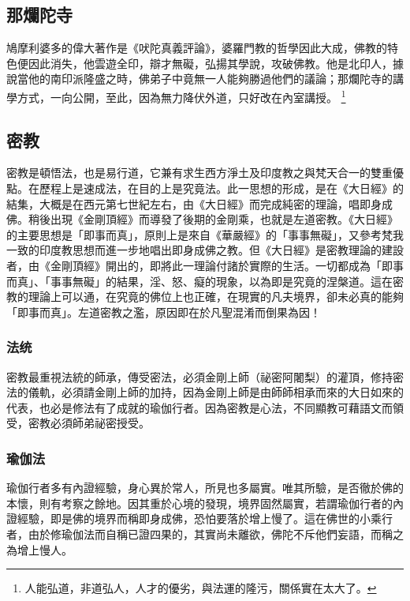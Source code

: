 \subsection{那爛陀寺}
鳩摩利婆多的偉大著作是《吠陀真義評論》，婆羅門教的哲學因此大成，佛教的特色便因此消失，他雲遊全印，辯才無礙，弘揚其學說，攻破佛教。他是北印人，據說當他的南印派隆盛之時，佛弟子中竟無一人能夠勝過他們的議論；那爛陀寺的講學方式，一向公開，至此，因為無力降伏外道，只好改在內室講授。
\footnote{人能弘道，非道弘人，人才的優劣，與法運的隆污，關係實在太大了。}

\subsection{密教}
密教是頓悟法，也是易行道，它兼有求生西方淨土及印度教之與梵天合一的雙重優點。在歷程上是速成法，在目的上是究竟法。此一思想的形成，是在《大日經》的結集，大概是在西元第七世紀左右，由《大日經》而完成純密的理論，唱即身成佛。稍後出現《金剛頂經》而導發了後期的金剛乘，也就是左道密教。《大日經》的主要思想是「即事而真」，原則上是來自《華嚴經》的「事事無礙」，又參考梵我一致的印度教思想而進一步地唱出即身成佛之教。但《大日經》是密教理論的建設者，由《金剛頂經》開出的，即將此一理論付諸於實際的生活。一切都成為「即事而真」、「事事無礙」的結果，淫、怒、癡的現象，以為即是究竟的涅槃道。這在密教的理論上可以通，在究竟的佛位上也正確，在現實的凡夫境界，卻未必真的能夠「即事而真」。左道密教之濫，原因即在於凡聖混淆而倒果為因！
\subsubsection{法统}
密教最重視法統的師承，傳受密法，必須金剛上師（祕密阿闍梨）的灌頂，修持密法的儀軌，必須請金剛上師的加持，因為金剛上師是由師師相承而來的大日如來的代表，也必是修法有了成就的瑜伽行者。因為密教是心法，不同顯教可藉語文而領受，密教必須師弟祕密授受。
\subsubsection{瑜伽法}
瑜伽行者多有內證經驗，身心異於常人，所見也多屬實。唯其所驗，是否徹於佛的本懷，則有考察之餘地。因其重於心境的發現，境界固然屬實，若謂瑜伽行者的內證經驗，即是佛的境界而稱即身成佛，恐怕要落於增上慢了。這在佛世的小乘行者，由於修瑜伽法而自稱已證四果的，其實尚未離欲，佛陀不斥他們妄語，而稱之為增上慢人。
